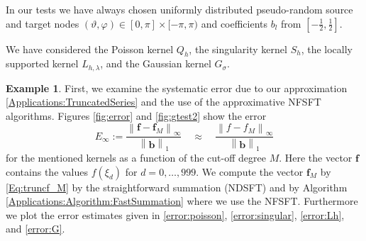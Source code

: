 \documentclass[11pt,a4paper,twoside,bibtotoc]{scrartcl}
\theoremstyle{plain}
\theoremstyle{definition}
\newtheorem{example}[theorem]{Example}
\theoremstyle{remark}
\numberwithin{equation}{section}
\numberwithin{table}{section}
\numberwithin{figure}{section}
\begin{document}
In our tests we have always chosen uniformly distributed pseudo-random 
source and target nodes 
$\left(\vartheta,\varphi\right) \in [0,\pi] \times [-\pi,\pi)$ and 
coefficients $b_l$ from $\left[-\frac{1}{2},\frac{1}{2}\right]$.

We have considered the Poisson kernel $Q_{h}$,
the singularity kernel $S_{h}$,
the locally supported kernel $L_{h,\lambda}$,
and the Gaussian kernel $G_{\sigma}$.

\begin{example}
First, we examine the systematic error due to our approximation
\eqref{Applications:TruncatedSeries} and the use of the approximative NFSFT
algorithms. Figures \ref{fig:error} and \ref{fig:gtest2} show the error
\[
E_{\infty}:=
\frac{\left\|\mathbf{f}-\mathbf{f}_M\right\|_{\infty}}{\left\|\mathbf{b}\right\|_{1}}
\quad \approx \quad \frac{\left\|f-f_M\right\|_{\infty}}{\left\|\mathbf{b}\right\|_{1}}
\]
for the mentioned kernels as a function of the cut-off degree $M$.
Here the vector $\mathbf{f}$ contains the values $f(\xi_d)$ for
$d=0,\ldots, 999$. We compute the vector $\mathbf{f}_M$ by
\eqref{Eq:truncf_M} by the straightforward summation (NDSFT) and by
Algorithm  \ref{Applications:Algorithm:FastSummation} where we use the NFSFT.
Furthermore we plot the error estimates given in \eqref{error:poisson},
\eqref{error:singular}, \eqref{error:Lh}, and \eqref{error:G}.
\end{example}
\end{document}
